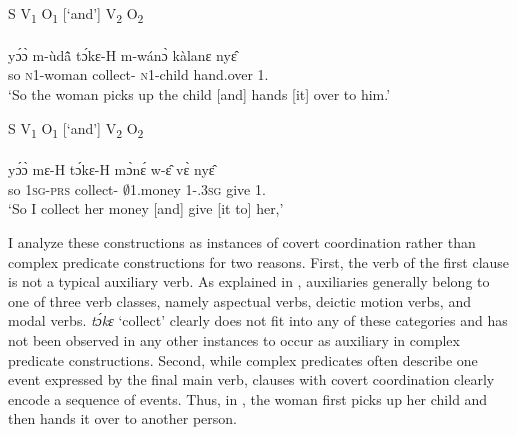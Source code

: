  
\ea\label{coCo1} S V\textsubscript{1} O\textsubscript{1} [`and'] V\textsubscript{2} O\textsubscript{2}\\
  \glll [yɔ́ɔ̀ mùdã̂ tɔ́kɛ́ mwánɔ̀] [kàlànɛ̀ nyɛ̂] \\
       {\db}yɔ́ɔ̀ m-ùdã̂ tɔ́kɛ-H m-wánɔ̀ {\db}kàlanɛ nyɛ̂ \\
      {\db}so \textsc{n}1-woman collect-{\R} \textsc{n}1-child {\db}hand.over 1.{\OBJ}\\
    \trans `So the woman picks up the child [and] hands [it] over to him.'
\z


\ea\label{coCo2} S V\textsubscript{1} O\textsubscript{1} [`and'] V\textsubscript{2} O\textsubscript{2}\\
  \glll  [yɔ́ɔ̀ mɛ́ tɔ́kɛ́ mɔ̀nɛ́ wɛ̂] [vɛ̀ nyɛ̂] \\
         {\db}yɔ́ɔ̀ mɛ-H tɔ́kɛ-H mɔ̀nɛ́ w-ɛ̂ {\db}vɛ̀ nyɛ̂ \\
         {\db}so 1\textsc{sg}-\textsc{prs} collect-{\R} $\emptyset$1.money 1-{\POSS}.3\textsc{sg} {\db}give 1.{\OBJ}   \\
    \trans `So I collect her money [and] give [it to] her,'
\z

I analyze these constructions as instances of covert coordination rather than complex predicate constructions for two reasons. First, the verb of the first clause is not a typical auxiliary verb. As explained in , auxiliaries generally belong to one of three verb classes, namely aspectual verbs, deictic motion verbs, and modal verbs. {\itshape tɔ́kɛ} `collect' clearly does not fit into any of these categories and has not been observed in any other instances to occur as auxiliary in complex predicate constructions. Second, while complex predicates often describe one event expressed by the final main verb, clauses with covert coordination clearly encode a sequence of events. Thus, in , the woman first picks up her child and then hands it over to another person.





